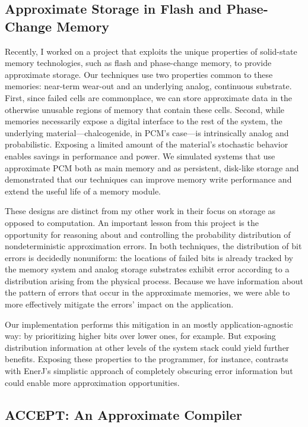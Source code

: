 \subsection{Approximate Storage in Flash and Phase-Change Memory}

Recently, I worked on a project that exploits the unique properties of
solid-state memory technologies, such as flash and phase-change memory,
to provide approximate storage. Our techniques use two properties common to these memories:
near-term wear-out and an underlying analog, continuous substrate. First, since
failed cells are commonplace, we can store approximate data in the otherwise
unusable regions of memory that contain these cells. Second, while memories
necessarily expose a digital interface to the rest of the system, the
underlying material---chalcogenide, in PCM's case---is intrinsically analog
and probabilistic. Exposing a limited amount of the material's stochastic
behavior enables savings in performance and power.
We simulated systems that use approximate PCM both as main memory and as
persistent, disk-like storage and demonstrated that our techniques can improve
memory write performance and extend the useful life of a memory module.

These designs are distinct from my other work in their focus on storage as
opposed to computation. An important lesson from this project is the
opportunity for reasoning about and controlling the probability distribution
of nondeterministic approximation errors. In both techniques, the distribution
of bit errors is decidedly nonuniform: the locations of failed bits is already
tracked by the memory system and analog storage substrates exhibit error
according to a distribution arising from the physical process. Because we have
information about the pattern of errors that occur in the approximate
memories, we were able to more effectively mitigate the errors' impact on the
application.

Our implementation performs this mitigation in an mostly application-agnostic
way: by prioritizing higher bits over lower ones, for example. But exposing
distribution information at other levels of the system stack could yield
further benefits. Exposing these properties to the programmer, for instance,
contrasts with EnerJ's simplistic approach of completely obscuring error
information but could enable more approximation opportunities.

\subsection{ACCEPT: An Approximate Compiler}
\label{sec:prelim:accept}

